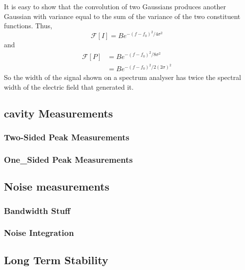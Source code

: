 It is easy to show that the convolution of two Gaussians produces another Gaussian with variance equal to the sum of the variance of the two constituent functions.
Thus,
\begin{equation}
\mathcal{F}[I] = B e^{-(f-f_0)^2/4\sigma^2}
\end{equation}
and
\begin{align}
\mathcal{F}[P] &= B e^{-(f-f_0)^2/8\sigma^2}\nonumber\\
&= B e^{-(f-f_0)^2/2(2\sigma)^2}
\end{align}
So the width of the signal shown on a spectrum analyser has twice the spectral width of the electric field that generated it.

\subsection{cavity Measurements}

\subsubsection{Two-Sided Peak Measurements}

\subsubsection{One_Sided Peak Measurements}

\subsection{Noise measurements}

\subsubsection{Bandwidth Stuff}

\subsubsection{Noise Integration}

\subsection{Long Term Stability}

